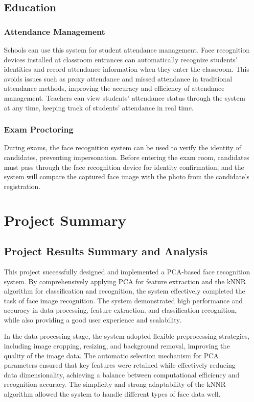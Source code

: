 \documentclass{article}
\begin{document}
\subsection{Education}

\subsubsection{Attendance Management}
Schools can use this system for student attendance management. Face recognition devices installed at classroom entrances can automatically recognize students' identities and record attendance information when they enter the classroom. This avoids issues such as proxy attendance and missed attendance in traditional attendance methods, improving the accuracy and efficiency of attendance management. Teachers can view students' attendance status through the system at any time, keeping track of students' attendance in real time.

\subsubsection{Exam Proctoring}
During exams, the face recognition system can be used to verify the identity of candidates, preventing impersonation. Before entering the exam room, candidates must pass through the face recognition device for identity confirmation, and the system will compare the captured face image with the photo from the candidate's registration.
\newpage
\section{Project Summary}

\subsection{Project Results Summary and Analysis}
This project successfully designed and implemented a PCA-based face recognition system. By comprehensively applying PCA for feature extraction and the kNNR algorithm for classification and recognition, the system effectively completed the task of face image recognition. The system demonstrated high performance and accuracy in data processing, feature extraction, and classification recognition, while also providing a good user experience and scalability.

In the data processing stage, the system adopted flexible preprocessing strategies, including image cropping, resizing, and background removal, improving the quality of the image data. The automatic selection mechanism for PCA parameters ensured that key features were retained while effectively reducing data dimensionality, achieving a balance between computational efficiency and recognition accuracy. The simplicity and strong adaptability of the kNNR algorithm allowed the system to handle different types of face data well.
\end{document}

